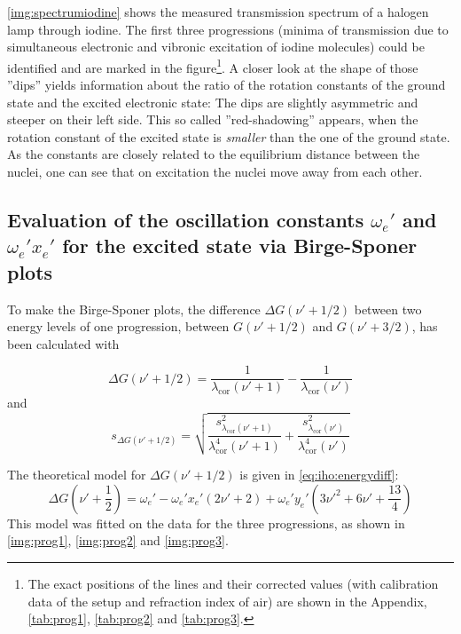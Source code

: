 \autoref{img:spectrumiodine} shows the measured transmission spectrum of a halogen lamp through iodine.
The first three progressions
(minima of transmission due to simultaneous electronic and vibronic excitation of iodine molecules)
could be identified and are marked in the
figure\footnote{The exact positions of the lines and
their corrected values (with calibration data of the setup and refraction index of air)
are shown in the Appendix, \autoref{tab:prog1}, \autoref{tab:prog2} and \autoref{tab:prog3}.}.
A closer look at the shape of those ''dips'' yields information about the ratio of the rotation constants
of the ground state and the excited electronic state:
The dips are slightly asymmetric and steeper on their left side. This so called
''red-shadowing'' appears, when the rotation constant of the excited state is \emph{smaller} than
the one of the ground state. As the constants are closely related to the equilibrium distance between the nuclei,
one can see that on excitation the nuclei move away from each other.



\subsection{Evaluation of the oscillation constants \texorpdfstring{$\omega_e'$}{we'} and \texorpdfstring{$\omega_e' x_e'$}{we'xe'} for the excited state via Birge-Sponer plots}
To make the Birge-Sponer plots,
the difference $\Delta G(\nu' +1/2)$ between two energy levels of one progression,
between $G(\nu' +1/2)$ and  $G(\nu' +3/2)$,
has been calculated with

\begin{equation}
  \Delta G(\nu' +1/2)=\frac{1}{\lambda_{\text{cor}}(\nu'+1)}-\frac{1}{\lambda_{\text{cor}}(\nu')}
\end{equation}
and
\begin{equation}
  s_{\Delta G(\nu' +1/2)}=
  \sqrt{\frac{s^2_{\lambda_{\text{cor}}(\nu'+1)}}{\lambda^4_{\text{cor}}(\nu'+1)}+
  \frac{s^2_{\lambda_{\text{cor}}(\nu')}}{\lambda^4_{\text{cor}}(\nu')}}
\end{equation}

The theoretical model for $\Delta G(\nu' +1/2)$ is given in \autoref{eq:iho:energydiff}:
\begin{equation}
  \Delta G(\nu' + \frac{1}{2})=\omega_e' - \omega_e' x_e'(2\nu'+2) + \omega_e' y_e'(3\nu'^2 + 6 \nu' +\frac{13}{4})
\end{equation}
This model was fitted on the data for the three progressions, as shown in \autoref{img:prog1},
\autoref{img:prog2} and \autoref{img:prog3}.

